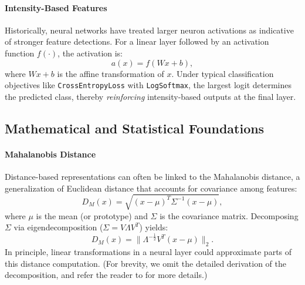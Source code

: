 \paragraph{Intensity-Based Features}
Historically, neural networks have treated larger neuron activations as indicative of stronger feature detections. For a linear layer followed by an activation function $f(\cdot)$, the activation is:
\begin{equation}
    a(x) = f(Wx + b),
    \label{eq:intensity-based}
\end{equation}
where $Wx + b$ is the affine transformation of $x$. Under typical classification objectives like \texttt{CrossEntropyLoss} with \texttt{LogSoftmax}, the largest logit determines the predicted class, thereby \emph{reinforcing} intensity-based outputs at the final layer.


\subsection{Mathematical and Statistical Foundations}

\paragraph{Mahalanobis Distance}
Distance-based representations can often be linked to the Mahalanobis distance, a generalization of Euclidean distance that accounts for covariance among features:
\begin{equation}
    D_M(x) = \sqrt{(x - \mu)^T \Sigma^{-1} (x - \mu)},
    \label{eq:mahalanobis-1}
\end{equation}
where $\mu$ is the mean (or prototype) and $\Sigma$ is the covariance matrix. 
Decomposing $\Sigma$ via eigendecomposition ($\Sigma = V \Lambda V^T$) yields:
\begin{equation}
    D_M(x) = \|\Lambda^{-\frac{1}{2}} V^T (x - \mu)\|_2.
    \label{eq:mahalanobis-2}
\end{equation}
In principle, linear transformations in a neural layer could approximate parts of this distance computation. (For brevity, we omit the detailed derivation of the decomposition, and refer the reader to  for more details.)

